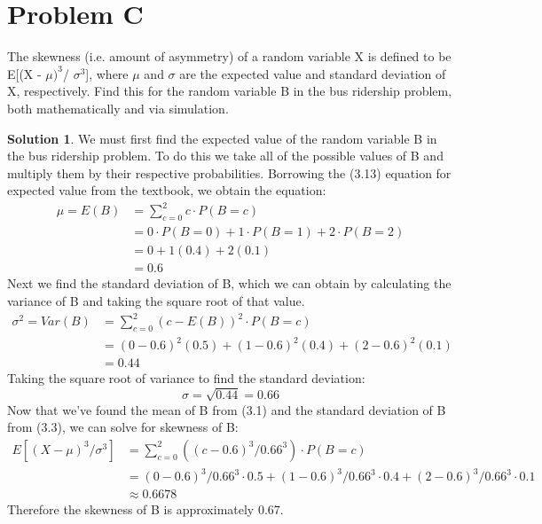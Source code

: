 \documentclass[paper=a4, fontsize=11pt]{scrartcl} %
\numberwithin{equation}{section} %
\numberwithin{figure}{section} %
\numberwithin{table}{section} %
\theoremstyle{definition}
\newtheorem*{solution}{Solution}
\begin{document}
\section{Problem C}
    The skewness (i.e. amount of asymmetry) of a random variable X is defined to be \\E[(X - ${\mu)^3}$/ ${\sigma^3}$], where ${\mu}$ and ${\sigma}$ are the expected value and standard deviation of X, respectively. Find this for the random variable B in the bus ridership problem, both mathematically and via simulation.
    \begin{solution}
        We must first find the expected value of the random variable B in the bus ridership problem. To do this we take all of the possible values of B and multiply them by their respective probabilities. Borrowing the (3.13) equation for expected value from the textbook, we obtain the equation:
        \begin{equation}
        \begin{split}
            \mu = E(B) &= \sum_{c=0}^2 c \cdot P(B=c) \\
            &= 0 \cdot P(B=0) + 1 \cdot P(B=1) + 2 \cdot P(B=2) \\
            &= 0 + 1(0.4) + 2(0.1) \\ 
            &= 0.6
            \end{split}
        \end{equation}
        Next we find the standard deviation of B, which we can obtain by calculating the variance of B and taking the square root of that value.
        \begin{equation}
        \begin{split}
            \sigma^2 = Var(B) &= \sum_{c=0}^2 (c - E(B))^2 \cdot P(B=c) \\
            &= (0 - 0.6)^2(0.5) + (1 - 0.6)^2(0.4) + (2 - 0.6)^2(0.1) \\
            &= 0.44
        \end{split}
        \end{equation}
        Taking the square root of variance to find the standard deviation:
        \begin{equation}
            \sigma = \sqrt{0.44} = 0.66
        \end{equation}
        Now that we've found the mean of B from (3.1) and the standard deviation of B from (3.3), we can solve for skewness of B:
        \begin{equation}
        \begin{split}
            E[(X - \mu)^3/ \sigma^3] &= \sum_{c=0}^2 ((c-0.6)^3 / 0.66^3) \cdot P(B=c) \\
            &= (0-0.6)^3 / 0.66^3 \cdot 0.5 + (1-0.6)^3 / 0.66^3 \cdot 0.4 + (2-0.6)^3 / 0.66^3 \cdot 0.1 \\
            &\approx 0.6678
        \end{split}
        \end{equation}
        Therefore the skewness of B is approximately 0.67.
    \end{solution}
    
\end{document}

